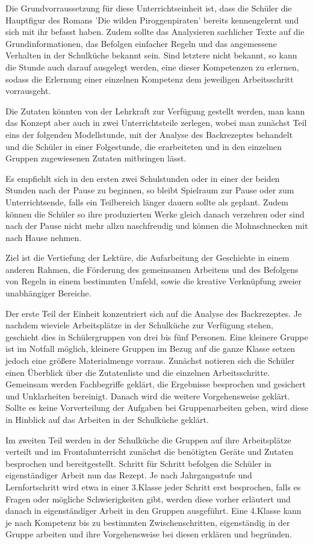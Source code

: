 {Die Grundvorraussetzung für diese Unterrichtseinheit ist, dass die Schüler die Hauptfigur des Romans 'Die wilden Piroggenpiraten' bereits kennengelernt und sich mit ihr befasst haben. Zudem sollte das Analysieren sachlicher Texte auf die Grundinformationen, das Befolgen einfacher Regeln und das angemessene Verhalten in der Schulküche bekannt sein. Sind letztere nicht bekannt, so kann die Stunde auch darauf ausgelegt werden, eine dieser Kompetenzen zu erlernen, sodass die Erlernung einer einzelnen Kompetenz dem jeweiligen Arbeitsschritt vorrausgeht.

Die Zutaten könnten von der Lehrkraft zur Verfügung gestellt werden, man kann das Konzept aber auch in zwei Unterrichtsteile zerlegen, wobei man zunächst Teil eins der folgenden Modellstunde, mit der Analyse des Backrezeptes behandelt und die Schüler in einer Folgestunde, die erarbeiteten und in den einzelnen Gruppen zugewiesenen Zutaten mitbringen lässt.

Es empfiehlt sich in den ersten zwei Schulstunden oder in einer der beiden Stunden nach der Pause zu beginnen, so bleibt Spielraum zur Pause oder zum Unterrichtsende, falls ein Teilbereich länger dauern sollte als geplant. Zudem können die Schüler so ihre produzierten Werke gleich danach verzehren oder sind nach der Pause nicht mehr allzu naschfreudig und können die Mohnschnecken mit nach Hause nehmen.

Ziel ist die Vertiefung der Lektüre, die Aufarbeitung der Geschichte in einem anderen Rahmen, die Förderung des gemeinsamen Arbeitens und des Befolgens von Regeln in einem bestimmten Umfeld, sowie die kreative Verknüpfung zweier unabhängiger Bereiche.

Der erste Teil der Einheit konzentriert sich auf die Analyse des Backrezeptes. Je nachdem wieviele Arbeitsplätze in der Schulküche zur Verfügung stehen, geschieht dies in Schülergruppen von drei bis fünf Personen. Eine kleinere Gruppe ist im Notfall möglich, kleinere Gruppen im Bezug auf die ganze Klasse setzen jedoch eine größere Materialmenge vorraus. Zunächst notieren sich die Schüler einen Überblick über die Zutatenliste und die einzelnen Arbeitsschritte. Gemeinsam werden Fachbegriffe geklärt, die Ergebnisse besprochen und gesichert und Unklarheiten bereinigt. Danach wird die weitere Vorgehensweise geklärt. Sollte es keine Vorverteilung der Aufgaben bei Gruppenarbeiten geben, wird diese in Hinblick auf das Arbeiten in der Schulküche geklärt.

Im zweiten Teil werden in der Schulküche die Gruppen auf ihre Arbeitsplätze verteilt und im Frontalunterricht zunächst die benötigten Geräte und Zutaten besprochen und bereitgestellt. Schritt für Schritt befolgen die Schüler in eigenständiger Arbeit nun das Rezept. Je nach Jahrgangsstufe und Lernfortschritt wird etwa in einer 3.Klasse  jeder Schritt erst besprochen, falls es Fragen oder mögliche Schwierigkeiten gibt, werden diese vorher erläutert und danach in eigenständiger Arbeit in den Gruppen ausgeführt. Eine 4.Klasse kann je nach Kompetenz bis zu bestimmten Zwischenschritten, eigenständig in der Gruppe arbeiten und ihre Vorgehensweise bei diesen erklären und begründen.

}
